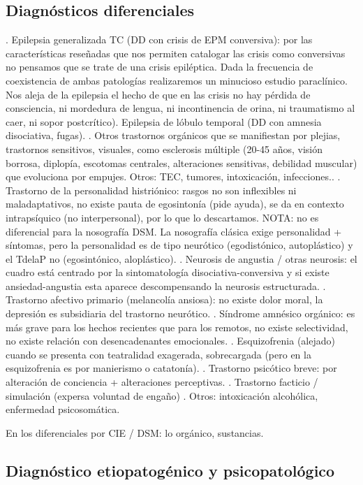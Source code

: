 \documentclass{scrbook}
\begin{document}
\subsection*{Diagnósticos diferenciales}
. Epilepsia generalizada TC (DD con crisis de EPM conversiva): por las características reseñadas que nos permiten catalogar las crisis como conversivas no pensamos que se trate de una crisis epiléptica. Dada la frecuencia de coexistencia de ambas patologías realizaremos un minucioso estudio paraclínico. Nos aleja de la epilepsia el hecho de que en las crisis no hay pérdida de consciencia, ni mordedura de lengua, ni incontinencia de orina, ni traumatismo al caer, ni sopor postcrítico). Epilepsia de lóbulo temporal (DD con amnesia disociativa, fugas).
. Otros trastornos orgánicos que se manifiestan por plejias, trastornos sensitivos, visuales, como esclerosis múltiple (20-45 años, visión borrosa, diplopía, escotomas centrales, alteraciones sensitivas, debilidad muscular) que evoluciona por empujes. Otros: TEC, tumores, intoxicación, infecciones..
. Trastorno de la personalidad histriónico: rasgos no son inflexibles ni maladaptativos, no existe pauta de egosintonía (pide ayuda), se da en contexto intrapsíquico (no interpersonal), por lo que lo descartamos. NOTA: no es diferencial para la nosografía DSM. La nosografía clásica exige personalidad + síntomas, pero la personalidad es de tipo neurótico (egodistónico, autoplástico) y el TdelaP no (egosintónico, aloplástico).
. Neurosis de angustia / otras neurosis: el cuadro está centrado por la sintomatología disociativa-conversiva y si existe ansiedad-angustia esta aparece descompensando la neurosis estructurada.
. Trastorno afectivo primario (melancolía ansiosa): no existe dolor moral, la depresión es subsidiaria del trastorno neurótico.
. Síndrome amnésico orgánico: es más grave para los hechos recientes que para los remotos, no existe selectividad, no existe relación con desencadenantes emocionales.
. Esquizofrenia (alejado) cuando se presenta con teatralidad exagerada, sobrecargada (pero en la esquizofrenia es por manierismo o catatonía).
. Trastorno psicótico breve: por alteración de conciencia + alteraciones perceptivas.
. Trastorno facticio / simulación (expersa voluntad de engaño)
. Otros: intoxicación alcohólica, enfermedad psicosomática.

En los diferenciales por CIE / DSM: lo orgánico, sustancias.

\subsection*{Diagnóstico etiopatogénico y psicopatológico}
\end{document}
